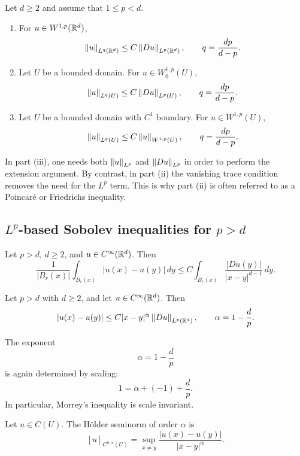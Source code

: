 \begin{theorem}
Let $d\ge 2$ and assume that $1\le p<d$.
\begin{enumerate}[label=\textup{(\roman*)}]
    \item For $u\in W^{1,p}(\mathbb{R}^d)$,
    \[
    \left\lVert u \right\rVert_{L^q(\mathbb{R}^d)} \le C\left\lVert Du \right\rVert_{L^p(\mathbb{R}^d)},
    \qquad q=\frac{dp}{d-p}.
    \]
    \item Let $U$ be a bounded domain. For $u\in W_0^{1,p}(U)$,
    \[
    \left\lVert u \right\rVert_{L^q(U)} \le C\left\lVert Du \right\rVert_{L^p(U)},
    \qquad q=\frac{dp}{d-p}.
    \]
    \item Let $U$ be a bounded domain with $C^1$ boundary. For $u\in W^{1,p}(U)$,
    \[
    \left\lVert u \right\rVert_{L^q(U)} \le C\left\lVert u \right\rVert_{W^{1,p}(U)},
    \qquad q=\frac{dp}{d-p}.
    \]
\end{enumerate}
\end{theorem}

\begin{remark}
In part \textup{(iii)}, one needs both $\left\lVert u \right\rVert_{L^p}$ and $\left\lVert Du \right\rVert_{L^p}$ in order to perform the extension argument. By contrast, in part \textup{(ii)} the vanishing trace condition removes the need for the $L^p$ term. This is why part \textup{(ii)} is often referred to as a Poincar\'{e} or Friedrichs inequality.
\end{remark}

\subsection{$L^p$-based Sobolev inequalities for $p>d$}

\begin{lemma}
Let $p>d$, $d\ge 2$, and $u\in C^\infty(\mathbb{R}^d)$. Then
\[
\frac{1}{|B_r(x)|}\int_{B_r(x)} |u(x)-u(y)|\,dy
\le
C\int_{B_r(x)} \frac{|Du(y)|}{|x-y|^{d-1}}\,dy.
\]
\end{lemma}

\begin{theorem}
Let $p>d$ with $d\ge 2$, and let $u\in C^\infty(\mathbb{R}^d)$. Then
\[
|u(x)-u(y)| \le C|x-y|^\alpha \left\lVert Du \right\rVert_{L^p(\mathbb{R}^d)},
\qquad \alpha = 1-\frac{d}{p}.
\]
\end{theorem}

\begin{remark}
The exponent
\[
\alpha = 1-\frac{d}{p}
\]
is again determined by scaling:
\[
1=\alpha + (-1)+\frac{d}{p}.
\]
In particular, Morrey's inequality is scale invariant.
\end{remark}

\begin{definition}
Let $u\in C(U)$. The H\"older seminorm of order $\alpha$ is
\[
[u]_{C^{0,\alpha}(U)} = \sup_{x\ne y} \frac{|u(x)-u(y)|}{|x-y|^\alpha}.
\]
\end{definition}

